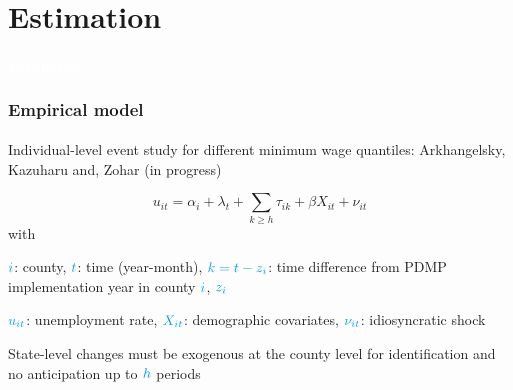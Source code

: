 
\section{Estimation}

\begin{transitionframe}

    \rmfamily %
    
    \begin{center}
    {\Huge \textbf{\textcolor{white}{Estimation}}}
    \end{center}
  
\end{transitionframe}

\begin{frame}

    \frametitle{Empirical model} %
    \framesubtitle{}  %
    \rmfamily %
    
    \begin{wideitemize}
        \item Individual-level event study for different minimum wage quantiles: \textcolor{fgre}{Arkhangelsky, Kazuharu and, Zohar (in progress)}
    \end{wideitemize}
    
    \begin{equation*}
        u_{it} = \alpha_i + \lambda_t + \sum_{k\geq h}\tau_{ik} + \beta X_{it} + \nu_{it}
    \end{equation*}
    with 
    \vspace{9pt}
    \begin{wideitemize}
        \item[\textcolor{fblu}{\textbullet}] \(\textcolor{fblu}{i}\): county, \(\textcolor{fblu}{t}\): time (year-month), \(\textcolor{fblu}{k = t - z_i}\): time difference from PDMP implementation year in county \(\textcolor{fblu}{i}\), \(\textcolor{fblu}{z_i}\)
        \item[\textcolor{fblu}{\textbullet}] \(\textcolor{fblu}{u_{it}}\): unemployment rate, \(\textcolor{fblu}{X_{it}}\): demographic covariates, \(\textcolor{fblu}{\nu_{it}}\): idiosyncratic shock 
    \end{wideitemize}
    \vspace{9pt}
    State-level changes must be exogenous at the county level for \textcolor{fblu}{identification} and no anticipation up to \(\textcolor{fblu}{h}\) periods
    
\end{frame}

